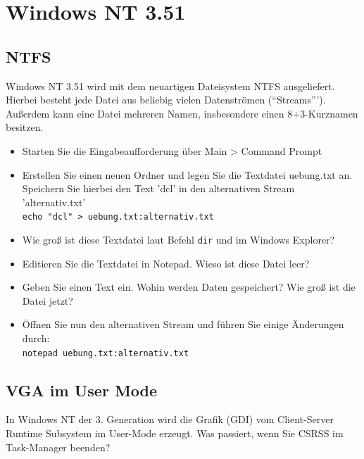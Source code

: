 \section{Windows NT 3.51}

	\subsection{NTFS}

	Windows NT 3.51 wird mit dem neuartigen Dateisystem NTFS ausgeliefert. Hierbei besteht jede Datei aus beliebig vielen Datenströmen ("`Streams"'').
	Außerdem kann eine Datei mehreren Namen, insbesondere einen 8+3-Kurznamen besitzen. 

	\begin{itemize}
		\item Starten Sie die Eingabeaufforderung über Main > Command Prompt
		\item Erstellen Sie einen neuen Ordner und legen Sie die Textdatei uebung.txt an.
		Speichern Sie hierbei den Text 'dcl' in den alternativen Stream 'alternativ.txt'\\
		\texttt{echo \string"dcl\string" > uebung.txt:alternativ.txt}
		\item Wie groß ist diese Textdatei laut Befehl \texttt{dir} und im Windows Explorer?
		\item Editieren Sie die Textdatei in Notepad. Wieso ist diese Datei leer? 
		\item Geben Sie einen Text ein. Wohin werden Daten gespeichert? Wie groß ist die Datei jetzt?
		\item Öffnen Sie nun den alternativen Stream und führen Sie einige Änderungen durch: \\
			\texttt{notepad uebung.txt:alternativ.txt}
	\end{itemize}

	\subsection{VGA im User Mode}

	In Windows NT der 3. Generation wird die Grafik (GDI) vom Client-Server Runtime Subsystem im User-Mode erzeugt.
	Was passiert, wenn Sie CSRSS im Task-Manager beenden?

